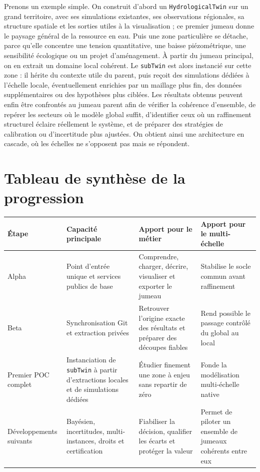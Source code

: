 \documentclass[11pt,a4paper]{article}
\newcommand{\hydrot}{\texttt{HydrologicalTwin}}
\begin{document}
Prenons un exemple simple. On construit d'abord un \hydrot{} sur un grand territoire, avec ses simulations existantes, ses observations régionales, sa structure spatiale et les sorties utiles à la visualisation ; ce premier jumeau donne le paysage général de la ressource en eau. Puis une zone particulière se détache, parce qu'elle concentre une tension quantitative, une baisse piézométrique, une sensibilité écologique ou un projet d'aménagement. À partir du jumeau principal, on en extrait un domaine local cohérent. Le \texttt{subTwin} est alors instancié sur cette zone : il hérite du contexte utile du parent, puis reçoit des simulations dédiées à l'échelle locale, éventuellement enrichies par un maillage plus fin, des données supplémentaires ou des hypothèses plus ciblées. Les résultats obtenus peuvent enfin être confrontés au jumeau parent afin de vérifier la cohérence d'ensemble, de repérer les secteurs où le modèle global suffit, d'identifier ceux où un raffinement structurel éclaire réellement le système, et de préparer des stratégies de calibration ou d'incertitude plus ajustées. On obtient ainsi une architecture en cascade, où les échelles ne s'opposent pas mais se répondent.

\section{Tableau de synthèse de la progression}

\begin{longtable}{>{\raggedright\arraybackslash}p{} >{\raggedright\arraybackslash}p{} >{\raggedright\arraybackslash}p{} >{\raggedright\arraybackslash}p{}}
\toprule
\textbf{Étape} & \textbf{Capacité principale} & \textbf{Apport pour le métier} & \textbf{Apport pour le multi-échelle} \\
\midrule
Alpha & Point d'entrée unique et services publics de base & Comprendre, charger, décrire, visualiser et exporter le jumeau & Stabilise le socle commun avant raffinement \\
Beta & Synchronisation Git et extraction privées & Retrouver l'origine exacte des résultats et préparer des découpes fiables & Rend possible le passage contrôlé du global au local \\
Premier POC complet & Instanciation de \texttt{subTwin} à partir d'extractions locales et de simulations dédiées & Étudier finement une zone à enjeu sans repartir de zéro & Fonde la modélisation multi-échelle native \\
Développements suivants & Bayésien, incertitudes, multi-instances, droits et certification & Fiabiliser la décision, qualifier les écarts et protéger la valeur & Permet de piloter un ensemble de jumeaux cohérents entre eux \\
\bottomrule
\end{longtable}
\end{document}
